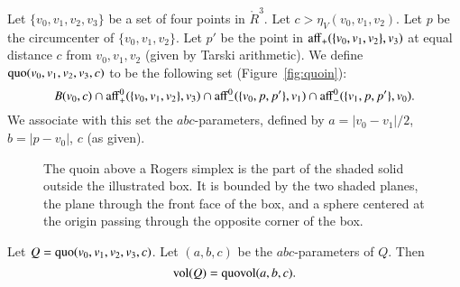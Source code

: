 \begin{definition}[quoin]\label{def:quoin}
Let $\{v_0,v_1,v_2,v_3\}$ be a set of four points in $\ring{R}^3$.
Let $c>  \eta_V(v_0,v_1,v_2)$.  Let $p$ be the circumcenter
of $\{v_0,v_1,v_2\}$.  Let $p'$ be the point 
in ${\operatorname{aff}}_+(\{v_0,v_1,v_2\},v_3)$ at equal distance $c$
from $v_0,v_1,v_2$ (given by Tarski arithmetic).
We define
${\operatorname{quo}}(v_0,v_1,v_2,v_3,c)$ to be the following set 
(Figure~\ref{fig:quoin}):
   $$
   B(v_0,c) \cap {\operatorname{aff}}_+^0(\{v_0,v_1,v_2\},v_3)
   \cap {\operatorname{aff}}_-^0(\{v_0,p,p'\},v_1) \cap
   {\operatorname{aff}}_-^0(\{v_1,p,p'\},v_0).
   $$
We associate with this set the $abc$-parameters, defined
by $a = |v_0-v_1|/2$, $b=|p-v_0|$, $c$ (as given).
\end{definition}

\begin{figure}[htb]
  \centering
  \caption{The quoin above a Rogers simplex is the part of the
  shaded solid outside
   the illustrated box.  It is bounded by the two
  shaded planes, the plane through
   the front face of the box, and a sphere
   centered at the origin passing through the opposite corner of the box.}
\end{figure}



\begin{lemma}
Let $Q={\operatorname{quo}}(v_0,v_1,v_2,v_3,c)$. Let $(a,b,c)$ be the
$abc$-parameters of $Q$.  
Then $${\operatorname{vol}}(Q) = {\operatorname{quovol}}(a,b,c).$$
%
\end{lemma}

